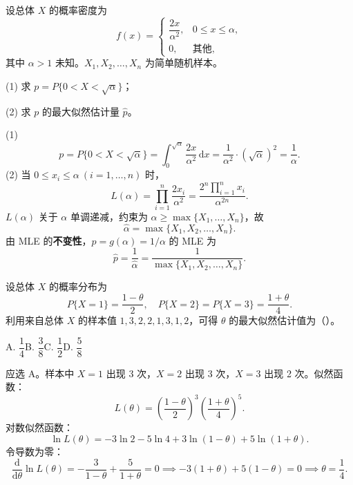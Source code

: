 \documentclass[lang=cn,11pt]{elegantbook}
\begin{document}
\begin{exercise}[最大似然估计的不变性] \label{ex:mle_04}
设总体 \(X\) 的概率密度为
\[
f(x)=
\begin{cases}
\dfrac{2x}{\alpha^2}, & 0\leq x\leq\alpha,\\
0, & \text{其他},
\end{cases}
\]
其中 \(\alpha>1\) 未知。\(X_1,X_2,\dots,X_n\) 为简单随机样本。\par
(1) 求 \(p=P\{0<X<\sqrt{\alpha}\}\)；\par
(2) 求 \(p\) 的最大似然估计量 \(\hat{p}\)。
\end{exercise}
\begin{solution}
(1)
\[
p=P\{0<X<\sqrt{\alpha}\}=\int_0^{\sqrt{\alpha}}\frac{2x}{\alpha^2}\,\mathrm{d}x=\frac{1}{\alpha^2}\cdot(\sqrt{\alpha})^2=\frac{1}{\alpha}.
\]
(2) 当 \(0\leq x_i\leq\alpha\ (i=1,\dots,n)\) 时，
\[
L(\alpha)=\prod_{i=1}^{n}\frac{2x_i}{\alpha^2}=\frac{2^n\prod_{i=1}^{n}x_i}{\alpha^{2n}}.
\]
\(L(\alpha)\) 关于 \(\alpha\) 单调递减，约束为 \(\alpha\geq\max\{X_1,\dots,X_n\}\)，故
\[
\hat{\alpha}=\max\{X_1,X_2,\dots,X_n\}.
\]
由 MLE 的\textbf{不变性}，\(p=g(\alpha)=1/\alpha\) 的 MLE 为
\[
\hat{p}=\frac{1}{\hat{\alpha}}=\frac{1}{\max\{X_1,X_2,\dots,X_n\}}.
\]
\end{solution}

\begin{exercise}[离散分布的最大似然估计] \label{ex:mle_01}
设总体 \(X\) 的概率分布为
\[
P\{X=1\}=\frac{1-\theta}{2},\quad P\{X=2\}=P\{X=3\}=\frac{1+\theta}{4}.
\]
利用来自总体 \(X\) 的样本值 \(1,3,2,2,1,3,1,2\)，可得 \(\theta\) 的最大似然估计值为（\quad）。\par
A. \(\dfrac{1}{4}\)\qquad B. \(\dfrac{3}{8}\)\qquad C. \(\dfrac{1}{2}\)\qquad D. \(\dfrac{5}{8}\)
\end{exercise}
\begin{solution}
应选 A。样本中 \(X=1\) 出现 3 次，\(X=2\) 出现 3 次，\(X=3\) 出现 2 次。似然函数：
\[
L(\theta)=\left(\frac{1-\theta}{2}\right)^{\!3}\left(\frac{1+\theta}{4}\right)^{\!5}.
\]
对数似然函数：
\[
\ln L(\theta)=-3\ln 2-5\ln 4+3\ln(1-\theta)+5\ln(1+\theta).
\]
令导数为零：
\[
\frac{\mathrm{d}}{\mathrm{d}\theta}\ln L(\theta)=-\frac{3}{1-\theta}+\frac{5}{1+\theta}=0
\implies -3(1+\theta)+5(1-\theta)=0
\implies \theta=\frac{1}{4}.
\]
\end{solution}
\end{document}
